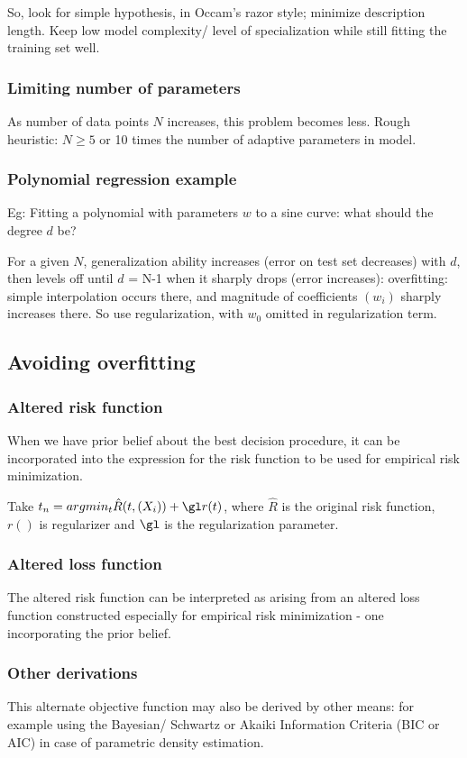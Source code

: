 \documentclass[oneside, article]{memoir}
\begin{document}
So, look for simple hypothesis, in Occam's razor style; minimize description length. Keep low model complexity/ level of specialization while still fitting the training set well.

\subsubsection{Limiting number of parameters}
As number of data points $N$ increases, this problem becomes less. Rough heuristic: $N \geq 5$ or 10 times the number of adaptive parameters in model.

\subsubsection{Polynomial regression example}
Eg: Fitting a polynomial with parameters $w$ to a sine curve: what should the degree $d$ be?

For a given $N$, generalization ability increases (error on test set decreases) with $d$, then levels off until $d$ = N-1 when it sharply drops (error increases): overfitting: simple interpolation occurs there, and magnitude of coefficients $(w_{i})$ sharply increases there. So use regularization, with $w_{0}$ omitted in regularization term.

\subsection{Avoiding overfitting}
\subsubsection{Altered risk function}
When we have prior belief about the best decision procedure, it can be incorporated into the expression for the risk function to be used for empirical risk minimization.

Take $t_n = argmin_t \hat{R}(t,(X_i)) + \gl r(t)$, where $\hat{R}$ is the original risk function, $r()$ is regularizer and $\gl$ is the regularization parameter.

\subsubsection{Altered loss function}
The altered risk function can be interpreted as arising from an altered loss function constructed especially for empirical risk minimization - one incorporating the prior belief.

\subsubsection{Other derivations}
This alternate objective function may also be derived by other means: for example using the Bayesian/ Schwartz or Akaiki Information Criteria (BIC or AIC) in case of parametric density estimation.
\end{document}
